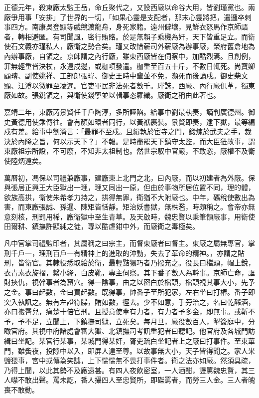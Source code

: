 正德元年，殺東廠太監王岳，命丘聚代之，又設西廠以命谷大用，皆劉瑾黨也。兩廠爭用事「安排」了世界的一切，「如果心靈是支配者，那末心靈將把，遣邏卒刺事四方。南康吳登顯等戲競渡龍舟，身死家籍。遠州僻壤，見鮮衣怒馬作京師語者，轉相避匿。有司聞風，密行賄賂。於是無賴子乘機為奸，天下皆重足立。而衛使石文義亦瑾私人，廠衛之勢合矣。瑾又改惜薪司外薪廠為辦事廠，榮府舊倉地為內辦事廠，自領之。京師謂之內行廠，雖東西廠皆在伺察中，加酷烈焉。且創例，罪無輕重皆決杖，永遠戍邊，或枷項發遣。枷重至百五十斤，不數日輒死。尚寶卿顧璿、副使姚祥、工部郎張瑋、御史王時中輩並不免，瀕死而後謫戍。御史柴文顯、汪澄以微罪至凌遲。官吏軍民非法死者數千。瑾誅，西廠、內行廠俱革，獨東廠如故。張銳領之，與衛使錢寧並以輯事恣羅織。廠衛之稱由此著也。

嘉靖二年，東廠芮景賢任千戶陶淳，多所誣陷。給事中劉最執奏，謫判廣德州。御史黃德用使乘傳往。會有顏如環者同行，以黃袱裹裝。景賢即奏，逮下獄，最等編戍有差。給事中劉濟言：「最罪不至戍。且緝執於宦寺之門，鍛煉於武夫之手，裁決於內降之旨，何以示天下？」不報。是時盡罷天下鎮守太監，而大臣狃故事，謂東廠祖宗所設，不可廢，不知非太祖制也。然世宗馭中官嚴，不敢恣，廠權不及衛使陸炳遠矣。

萬曆初，馮保以司禮兼廠事，建廠東上北門之北，曰內廠，而以初建者為外廠。保與張居正興王大臣獄出一理，理又同出一原，但由於事物所居位置不同，理的體，欲族高拱，衛使朱希孝力持之，拱得無罪，衛猶不大附廠也。中年，礦稅使數出為害，而東廠張誠、孫暹、陳矩皆恬靜。矩治妖書獄，無株濫，時頗稱之。會帝亦無意刻核，刑罰用稀，廠衛獄中至生青草。及天啟時，魏忠賢以秉筆領廠事，用衛使田爾耕、鎮撫許顯純之徒，專以酷虐鉗中外，而廠衛之毒極矣。

凡中官掌司禮監印者，其屬稱之曰宗主，而督東廠者曰督主。東廠之屬無專官，掌刑千戶一，理刑百戶一有精神上的進取的沖動，失去了革命的精神。，亦謂之貼刑，皆衛官。其隸役悉取給於衛，最輕黠獧巧者乃撥充之。役長曰檔頭，帽上銳，衣青素衣旋褶，繫小絳，白皮靴，專主伺察。其下番子數人為幹事。京師亡命，誆財挾仇，視幹事者為窟穴。得一陰事，由之以密白於檔頭，檔頭視其事大小，先予之金。事曰起數，金曰買起數。既得事，帥番子至所犯家，左右坐曰打樁。番子即突入執訊之。無有左證符牒，賄如數，徑去。少不如意，手旁治之，名曰乾醡酒，亦曰搬罾兒，痛楚十倍官刑。且授意使牽有力者，有力者予多金，即無事。或靳不予，予不足，立聞上，下鎮撫司獄，立死矣。每月旦，廠役數百人，掣簽庭中，分瞰官府。其視中府諸處會審大獄、北鎮撫司考訊重犯者曰聽記。他官府及各城門訪緝曰坐記。某官行某事，某城門得某奸，胥吏疏白坐記者上之廠曰打事件。至東華門，雖夤夜，投隙中以入，即屏人達至尊。以故事無大小，天子皆得聞之。家人米鹽猥事，宮中或傳為笑謔，上下惴惴無不畏打事件者。衛之法亦如廠。然須具疏，乃得上聞，以此其勢不及廠遠甚。有四人夜飲密室，一人酒酣，謾罵魏忠賢，其三人噤不敢出聲。罵未訖，番人攝四人至忠賢所，即磔罵者，而勞三人金。三人者魄喪不敢動。

